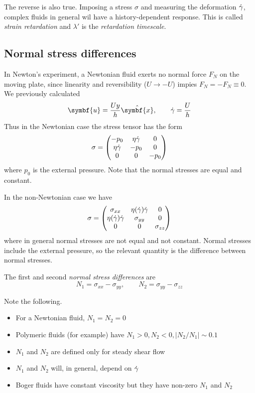 \documentclass{jknotes}
\begin{document}
The reverse is also true. Imposing a stress $\sigma$ and measuring the
deformation $\dot{\gamma}$, complex fluids in general wil have a
history-dependent response. This is called \emph{strain retardation} and
$\lambda'$ is the \emph{retardation timescale}.

\subsection{Normal stress differences}
In Newton's experiment, a Newtonian fluid exerts no normal force $F_N$ on the moving
plate, since linearity and reversibility ($U \to -U$) impies $F_N = -F_N
\equiv 0$. We previously calculated 
\begin{equation}
	\symbf{u} = \frac{Uy}{h}\hat{\symbf{x}}, \hspace{2em} \srate = \frac{U}{h}
\end{equation}
Thus in the Newtonian case the stress tensor has the form
\begin{equation}
	\sigma = \begin{pmatrix}
		-p_0 & \eta \dot{\gamma} & 0 \\
		\eta \dot{\gamma} & -p_0 & 0 \\
	0 & 0 & -p_0 \end{pmatrix}
\end{equation}
where $p_0$ is the external pressure. Note that the normal stresses are equal
and constant.

In the non-Newtonian case we have
\begin{equation}
	\sigma = \begin{pmatrix}
		\sigma_{xx} & \eta(\dot{\gamma}) \dot{\gamma} & 0 \\
		\eta(\dot{\gamma}) \dot{\gamma} & \sigma_{yy} & 0 \\
	0 & 0 & \sigma_{zz} \end{pmatrix}
\end{equation}
where in general normal stresses are not equal and not constant. Normal
stresses include the external pressure, so the relevant quantity is the
difference between normal stresses.
\begin{defn}
	The first and second \emph{normal stress differences} are
	\begin{equation}
		N_1 = \sigma_{xx} - \sigma_{yy}, \hspace{2em} N_2 = \sigma_{yy} -
		\sigma_{zz}
	\end{equation}
\end{defn}

Note the following.
\begin{itemize}
	\item For a Newtonian fluid, $N_1 = N_2 = 0$
	\item Polymeric fluids (for example) have $N_1 > 0, N_2 < 0, \left|
		N_2/N_1 \right| \sim 0.1$
	\item $N_1$ and $N_2$ are defined only for steady shear flow
	\item $N_1$ and $N_2$ will, in general, depend on $\dot{\gamma}$
	\item Boger fluids have constant viscosity but they have non-zero $N_1$
		and $N_2$
\end{itemize}
\end{document}
